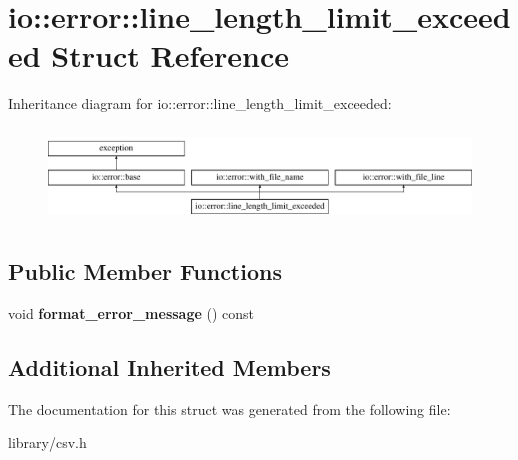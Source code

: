 \hypertarget{structio_1_1error_1_1line__length__limit__exceeded}{}\section{io\+:\+:error\+:\+:line\+\_\+length\+\_\+limit\+\_\+exceeded Struct Reference}
\label{structio_1_1error_1_1line__length__limit__exceeded}
Inheritance diagram for io\+:\+:error\+:\+:line\+\_\+length\+\_\+limit\+\_\+exceeded\+:\begin{figure}[H]
\begin{center}
\leavevmode
\includegraphics[height=2.522523cm]{structio_1_1error_1_1line__length__limit__exceeded}
\end{center}
\end{figure}
\subsection*{Public Member Functions}
\begin{DoxyCompactItemize}
\item 
\mbox{\label{structio_1_1error_1_1line__length__limit__exceeded_ae6ef1cf3ed1d82804953ac120892b85e}} 
void {\bfseries format\+\_\+error\+\_\+message} () const
\end{DoxyCompactItemize}
\subsection*{Additional Inherited Members}


The documentation for this struct was generated from the following file\+:\begin{DoxyCompactItemize}
\item 
library/csv.\+h\end{DoxyCompactItemize}
